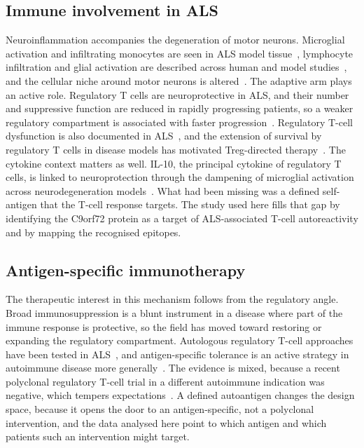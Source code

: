 \documentclass[11pt]{article}
\begin{document}
\subsection{Immune involvement in ALS}
Neuroinflammation accompanies the degeneration of motor neurons. Microglial activation and
infiltrating monocytes are seen in ALS model tissue~\citep{komiya2020}, lymphocyte infiltration and
glial activation are described across human and model studies~\citep{endo2016}, and the cellular
niche around motor neurons is altered~\citep{kovacs2021}. The adaptive arm plays an active role.
Regulatory T cells are neuroprotective in ALS, and their number and suppressive function are reduced
in rapidly progressing patients, so a weaker regulatory compartment is associated with faster
progression~\citep{appel2012}. Regulatory T-cell dysfunction is also documented in
ALS~\citep{appel2020}, and the extension of survival by regulatory T cells in disease models has
motivated Treg-directed therapy~\citep{rajabinejad2019}. The cytokine context matters as well. IL-10,
the principal cytokine of regulatory T cells, is linked to neuroprotection through the dampening of
microglial activation across neurodegeneration models~\citep{runge2020,laffer2019,bido2024}. What had
been missing was a defined self-antigen that the T-cell response targets. The study used here fills
that gap by identifying the C9orf72 protein as a target of ALS-associated T-cell autoreactivity and
by mapping the recognised epitopes.

\subsection{Antigen-specific immunotherapy}
The therapeutic interest in this mechanism follows from the regulatory angle. Broad
immunosuppression is a blunt instrument in a disease where part of the immune response is
protective, so the field has moved toward restoring or expanding the regulatory compartment.
Autologous regulatory T-cell approaches have been tested in ALS~\citep{thonhoff2018}, and
antigen-specific tolerance is an active strategy in autoimmune disease more
generally~\citep{nepom2022}. The evidence is mixed, because a recent polyclonal regulatory T-cell trial in a
different autoimmune indication was negative, which tempers expectations~\citep{al2024}. A defined
autoantigen changes the design space, because it opens the door to an antigen-specific, not a polyclonal
intervention, and the data analysed here point to which antigen and which patients such an
intervention might target.
\end{document}
